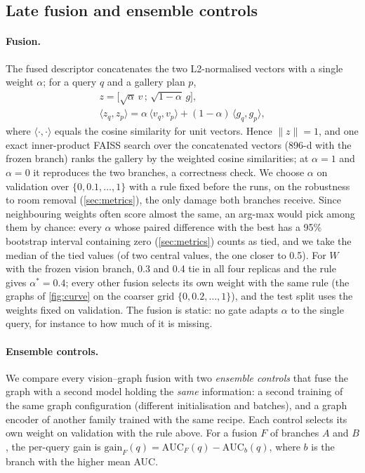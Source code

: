 \subsection{Late fusion and ensemble controls}
\label{sec:method_fusion}

\paragraph{Fusion.}
The fused descriptor concatenates the two L2-normalised vectors with a single weight $\alpha$; for a query $q$ and a gallery plan $p$,
\begin{equation}
  \begin{gathered}
  z = \bigl[\sqrt{\alpha}\,v \,;\, \sqrt{1-\alpha}\,g\bigr],\\
  \langle z_q, z_p\rangle = \alpha\,\langle v_q, v_p\rangle + (1-\alpha)\,\langle g_q, g_p\rangle,
  \end{gathered}
  \label{eq:fusion}
\end{equation}
where $\langle\cdot,\cdot\rangle$ equals the cosine similarity for unit vectors.
Hence $\lVert z\rVert=1$, and one exact inner-product FAISS search over the concatenated vectors (896-d with the frozen branch) ranks the gallery by the weighted cosine similarities; at $\alpha=1$ and $\alpha=0$ it reproduces the two branches, a correctness check.
We choose $\alpha$ on validation over $\{0, 0.1, \dots, 1\}$ with a rule fixed before the runs, on the robustness to room removal (\cref{sec:metrics}), the only damage both branches receive.
Since neighbouring weights often score almost the same, an arg-max would pick among them by chance: every $\alpha$ whose paired difference with the best has a 95\% bootstrap interval containing zero (\cref{sec:metrics}) counts as tied, and we take the median of the tied values (of two central values, the one closer to 0.5).
For $W$ with the frozen vision branch, 0.3 and 0.4 tie in all four replicas and the rule gives $\alpha^*=0.4$; every other fusion selects its own weight with the same rule (the graphs of \cref{fig:curve} on the coarser grid $\{0, 0.2, \dots, 1\}$), and the test split uses the weights fixed on validation.
The fusion is static: no gate adapts $\alpha$ to the single query, for instance to how much of it is missing.

\paragraph{Ensemble controls.}
We compare every vision--graph fusion with two \emph{ensemble controls} that fuse the graph with a second model holding the \emph{same} information: a second training of the same graph configuration (different initialisation and batches), and a graph encoder of another family trained with the same recipe.
Each control selects its own weight on validation with the rule above.
For a fusion $F$ of branches $A$ and $B$, the per-query gain is $\mathrm{gain}_F(q)=\mathrm{AUC}_F(q)-\mathrm{AUC}_{b}(q)$, where $b$ is the branch with the higher mean AUC.

